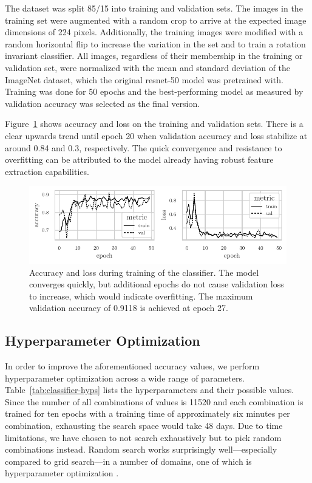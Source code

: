 \documentclass[final]{vutinfth} %
\begin{document}
The dataset was split 85/15 into training and validation sets. The
images in the training set were augmented with a random crop to arrive
at the expected image dimensions of \num{224} pixels. Additionally,
the training images were modified with a random horizontal flip to
increase the variation in the set and to train a rotation invariant
classifier. All images, regardless of their membership in the training
or validation set, were normalized with the mean and standard
deviation of the ImageNet \cite{deng2009} dataset, which the original
\gls{resnet}-50 model was pretrained with. Training was done for
\num{50} epochs and the best-performing model as measured by
validation accuracy was selected as the final version.

Figure~\ref{fig:classifier-training-metrics} shows accuracy and loss
on the training and validation sets. There is a clear upwards trend
until epoch \num{20} when validation accuracy and loss stabilize at
around \num{0.84} and \num{0.3}, respectively. The quick convergence
and resistance to overfitting can be attributed to the model already
having robust feature extraction capabilities.

\begin{figure}
  \centering
  \includegraphics{graphics/classifier-metrics.pdf}
  \caption[Classifier accuracy and loss during training.]{Accuracy and
    loss during training of the classifier. The model converges
    quickly, but additional epochs do not cause validation loss to
    increase, which would indicate overfitting. The maximum validation
    accuracy of \num{0.9118} is achieved at epoch \num{27}.}
  \label{fig:classifier-training-metrics}
\end{figure}

\subsection{Hyperparameter Optimization}
\label{ssec:class-hypopt}

In order to improve the aforementioned accuracy values, we perform
hyperparameter optimization across a wide range of
parameters. Table~\ref{tab:classifier-hyps} lists the hyperparameters
and their possible values. Since the number of all combinations of
values is \num{11520} and each combination is trained for ten epochs
with a training time of approximately six minutes per combination,
exhausting the search space would take \num{48} days. Due to time
limitations, we have chosen to not search exhaustively but to pick
random combinations instead. Random search works surprisingly
well---especially compared to grid search---in a number of domains, one of
which is hyperparameter optimization \cite{bergstra2012}.
\end{document}
